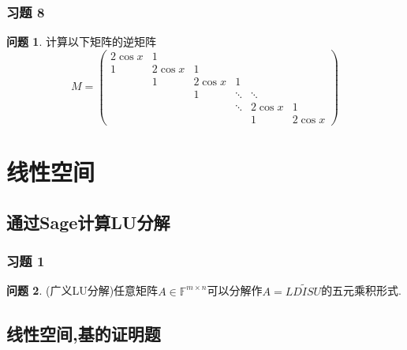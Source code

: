 \documentclass[11pt]{ctexart}
\theoremstyle{definition}
\newtheorem{qqq}{问题}[section]
\numberwithin{equation}{section}
\begin{document}
\subsubsection{习题 8}
\begin{qqq}
    计算以下矩阵的逆矩阵
    \begin{equation}
        M=\begin{pmatrix}
            2\cos x&1 & & & & \\1&2\cos x&1 \\&1&2\cos x&1\\&& 1&\ddots&\ddots\\&&&\ddots&2\cos x&1\\&&&&1&2\cos x
        \end{pmatrix}
    \end{equation}
\end{qqq}
\begin{aaa}
    
\end{aaa}





\newpage
\section{线性空间}
\subsection{通过Sage计算LU分解}
\subsubsection{习题 1}
\begin{qqq}
    (广义LU分解)任意矩阵$A\in \mathbb{F}^{m\times n}$可以分解作$A=LD\widetilde{I}SU$的五元乘积形式.
\end{qqq}
\begin{aaa}
    

\end{aaa}

\subsection{线性空间,基的证明题}
\end{document}
